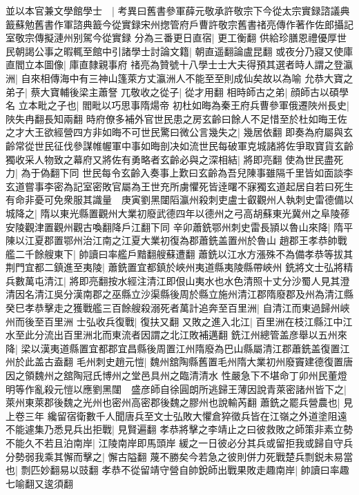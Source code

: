 並以本官兼文學館學士　|{
	考異曰舊書參軍薛元敬承許敬宗下今從太宗實録諮議典籖蘇勉舊書作軍諮典籖今從實録宋州揔管府戶曹許敬宗舊書禇亮傳作著作佐郎攝記室敬宗傳擬漣州别駕今從實録}
分為三番更日直宿|{
	更工衡翻}
供給珍膳恩禮優厚世民朝謁公事之暇輒至館中引諸學士討論文籍|{
	朝直遥翻論盧昆翻}
或夜分乃寢又使庫直閻立本圖像|{
	庫直隸親事府}
禇亮為贊號十八學士士大夫得預其選者時人謂之登瀛洲|{
	自來相傳海中有三神山篷萊方丈瀛洲人不能至至則成仙矣故以為喻}
允恭大寶之弟子|{
	蔡大寶輔後梁主蕭詧}
兀敬收之從子|{
	從才用翻}
相時師古之弟|{
	顔師古以碩學名}
立本毗之子也|{
	閻毗以巧思事隋煬帝}
初杜如晦為秦王府兵曹參軍俄遷陜州長史|{
	陜失冉翻長知兩翻}
時府僚多補外官世民患之房玄齡曰餘人不足惜至於杜如晦王佐之才大王欲經營四方非如晦不可世民驚曰微公言幾失之|{
	幾居依翻}
即奏為府屬與玄齡常從世民征伐參謀帷幄軍中事如晦剖决如流世民每破軍克城諸將佐爭取寶貨玄齡獨收采人物致之幕府又將佐有勇略者玄齡必與之深相結|{
	將即亮翻}
使為世民盡死力|{
	為于偽翻下同}
世民每令玄齡入奏事上歎曰玄齡為吾兒陳事雖隔千里皆如面談李玄道嘗事李密為記室密敗官屬為王世充所虜懼死皆逹曙不寐獨玄道起居自若曰死生有命非憂可免衆服其識量　庚寅劉黑闥䧟瀛州殺刺吏盧士叡觀州人執刺史雷德備以城降之|{
	隋以東光縣置觀州大業初廢武德四年以德州之弓高胡蘇東光冀州之阜陵蓚安陵觀津置觀州觀古喚翻降戶江翻下同}
辛卯蕭銑鄂州刺史雷長頴以魯山來降|{
	隋平陳以江夏郡置鄂州治江南之江夏大業初復為郡蕭銑盖置州於魯山}
趙郡王孝恭帥戰艦二千餘艘東下|{
	帥讀曰率艦戶黯翻艘蘇遭翻}
蕭銑以江水方漲殊不為備孝恭等拔其荆門宜都二鎮進至夷陵|{
	蕭銑置宜都鎮於峽州夷道縣夷陵縣帶峽州}
銑將文士弘將精兵數萬屯清江|{
	將即亮翻按水經注清江即佷山夷水也水色清照十丈分沙蜀人見其澄清因名清江吳分漢南郡之巫縣立沙渠縣後周於縣立施州清江郡隋廢郡及州為清江縣}
癸巳孝恭擊走之獲戰艦三百餘艘殺溺死者萬計追奔至百里洲|{
	自清江而東過歸州峽州而後至百里洲}
士弘收兵復戰|{
	復扶又翻}
又敗之進入北江|{
	百里洲在枝江縣江中江水至此分流出百里洲北而東流者因謂之北江敗補邁翻}
銑江州總管盖彦舉以五州來降|{
	梁以漢夷道縣置宜都郡宜昌縣後周置江州隋廢為巴山縣屬清江郡蕭銑盖復置江州於此盖古盍翻}
毛州刺史趙元愷|{
	魏州舘陶縣舊置毛州隋大業初州廢竇建德復置唐因之領魏州之舘陶冠氏博州之堂邑具州之臨清清水}
性嚴急下不堪命丁卯州民董燈明等作亂殺元愷以應劉黑闥　盛彦師自徐圓朗所逃歸王薄因說青萊密諸州皆下之|{
	萊州東萊郡後魏之光州也密州高密郡後魏之膠州也說輸芮翻}
蕭銑之罷兵營農也|{
	見上卷三年}
纔留宿衛數千人聞唐兵至文士弘敗大懼倉猝徵兵皆在江嶺之外道塗阻遠不能遽集乃悉見兵出拒戰|{
	見賢遍翻}
孝恭將擊之李靖止之曰彼救敗之師策非素立勢不能久不若且泊南岸|{
	江陵南岸即馬頭岸}
緩之一日彼必分其兵或留拒我或歸自守兵分勢弱我乘其懈而擊之|{
	懈古隘翻}
蔑不勝矣今若急之彼則併力死戰楚兵剽鋭未易當也|{
	剽匹妙翻易以豉翻}
孝恭不從留靖守營自帥銳師出戰果敗走趣南岸|{
	帥讀曰率趣七喻翻又逡須翻}
